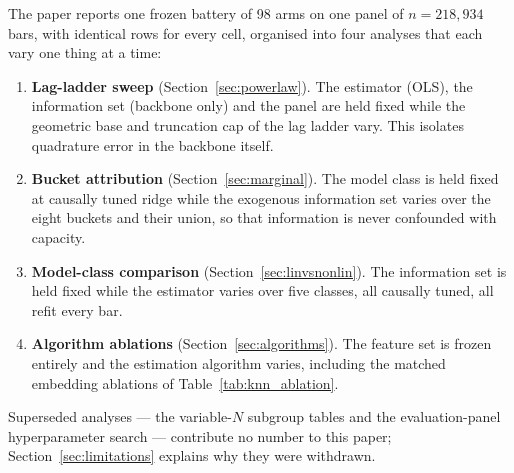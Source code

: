 The paper reports one frozen battery of 98 arms on one panel of
$n = 218{,}934$ bars, with identical rows for every cell, organised into four
analyses that each vary one thing at a time:

\begin{enumerate}
    \item \textbf{Lag-ladder sweep} (Section~\ref{sec:powerlaw}). The estimator
      (OLS), the information set (backbone only) and the panel are held fixed
      while the geometric base and truncation cap of the lag ladder vary. This
      isolates quadrature error in the backbone itself.

    \item \textbf{Bucket attribution} (Section~\ref{sec:marginal}). The model
      class is held fixed at causally tuned ridge while the exogenous
      information set varies over the eight buckets and their union, so that
      information is never confounded with capacity.

    \item \textbf{Model-class comparison} (Section~\ref{sec:linvsnonlin}). The
      information set is held fixed while the estimator varies over five
      classes, all causally tuned, all refit every bar.

    \item \textbf{Algorithm ablations} (Section~\ref{sec:algorithms}). The
      feature set is frozen entirely and the estimation algorithm varies,
      including the matched embedding ablations of
      Table~\ref{tab:knn_ablation}.
\end{enumerate}

Superseded analyses --- the variable-$N$ subgroup tables and the
evaluation-panel hyperparameter search --- contribute no number to this paper;
Section~\ref{sec:limitations} explains why they were withdrawn.
